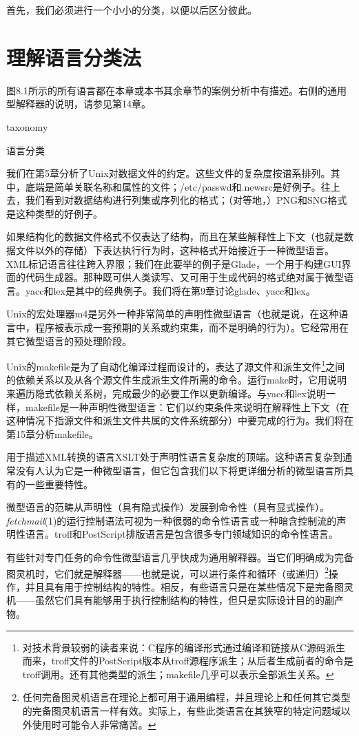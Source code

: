 \documentclass[12pt,oneside]{book}
\begin{document}
\begin{common-format}
首先，我们必须进行一个小小的分类，以便以后区分彼此。

\section{理解语言分类法}
图8.1所示的所有语言都在本章或本书其余章节的案例分析中有描述。右侧的通用型解释器的说明，请参见第14章。

\begin{linefig}{taxonomy}
\caption{语言分类}
\label{figtaxonomy:}
\end{linefig}

我们在第5章分析了Unix对数据文件的约定。这些文件的复杂度按谱系排列。其中，底端是简单关联名称和属性的文件；/etc/passwd和.newsrc是好例子。往上去，我们看到对数据结构进行列集或序列化的格式；（对等地，）PNG和SNG格式是这种类型的好例子。

如果结构化的数据文件格式不仅表达了结构，而且在某些解释性上下文（也就是数据文件以外的存储）下表达执行行为时，这种格式开始接近于一种微型语言。XML标记语言往往跨入界限；我们在此要举的例子是Glade，一个用于构建GUI界面的代码生成器。那种既可供人类读写、又可用于生成代码的格式绝对属于微型语言。yacc和lex是其中的经典例子。我们将在第9章讨论glade、yacc和lex。

Unix的宏处理器m4是另外一种非常简单的声明性微型语言（也就是说，在这种语言中，程序被表示成一套预期的关系或约束集，而不是明确的行为）。它经常用在其它微型语言的预处理阶段。

Unix的makefile是为了自动化编译过程而设计的，表达了源文件和派生文件\footnote{对技术背景较弱的读者来说：C程序的编译形式通过编译和链接从C源码派生而来，troff文件的PostScript版本从troff源程序派生；从后者生成前者的命令是troff调用。还有其他类型的派生；makefile几乎可以表示全部派生关系。}之间的依赖关系以及从各个源文件生成派生文件所需的命令。运行make时，它用说明来遍历隐式依赖关系树，完成最少的必要工作以更新编译。与yacc和lex说明一样，makefile是一种声明性微型语言：它们以约束条件来说明在解释性上下文（在这种情况下指源文件和派生文件共属的文件系统部分）中要完成的行为。我们将在第15章分析makefile。

用于描述XML转换的语言XSLT处于声明性语言复杂度的顶端。这种语言复杂到通常没有人认为它是一种微型语言，但它包含我们以下将更详细分析的微型语言所具有的一些重要特性。

微型语言的范畴从声明性（具有隐式操作）发展到命令性（具有显式操作）。\textit{fetchmail}(1)的运行控制语法可视为一种很弱的命令性语言或一种暗含控制流的声明性语言。troff和PostScript排版语言是包含很多专门领域知识的命令性语言。

有些针对专门任务的命令性微型语言几乎快成为通用解释器。当它们明确成为完备图灵机时，它们就是解释器——也就是说，可以进行条件和循环（或递归）\footnote{任何完备图灵机语言在理论上都可用于通用编程，并且理论上和任何其它类型的完备图灵机语言一样有效。实际上，有些此类语言在其狭窄的特定问题域以外使用时可能令人非常痛苦。}操作，并且具有用于控制结构的特性。相反，有些语言只是在某些情况下是完备图灵机——虽然它们具有能够用于执行控制结构的特性，但只是实际设计目的的副产物。


\end{common-format}
\end{document}
